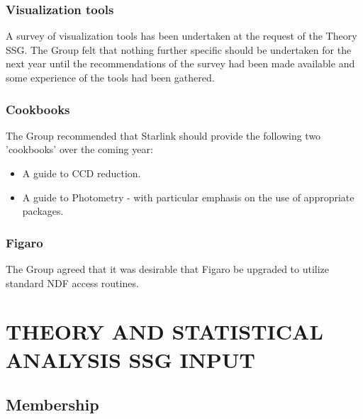 \subsubsection{Visualization tools}

A survey of visualization tools has been undertaken at the request of
the Theory SSG. The Group felt that nothing further specific should be
undertaken for the next year until the recommendations of the survey
had been made available and some experience of the tools had been
gathered.

\subsubsection{Cookbooks}

The Group recommended that Starlink should provide the following two
'cookbooks' over the coming year:
\begin{itemize}
\item A guide to CCD reduction.
\item A guide to Photometry - with particular emphasis on the use of
appropriate packages.
\end{itemize}

\subsubsection{Figaro}

The Group agreed that it was desirable that Figaro be upgraded to
utilize standard NDF access routines.

\newpage
\section{THEORY AND STATISTICAL ANALYSIS SSG INPUT}

\subsection{Membership}

